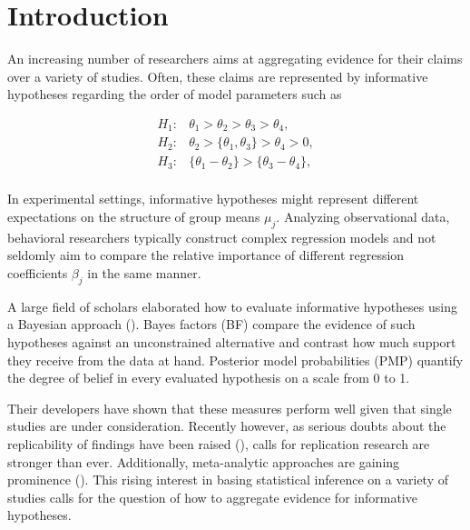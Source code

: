 \documentclass[11pt, a4paper]{article} %
\begin{document}
\section{Introduction}
An increasing number of researchers aims at aggregating evidence for their claims over a variety of studies. Often, these claims are represented by informative hypotheses regarding the order of model parameters such as

\begin{equation}
\begin{aligned}
H_1: & \theta_1>\theta_2>\theta_3>\theta_4, \\
H_2: & \theta_2>\{\theta_1 , \theta_3\}>\theta_4 > 0, \\
H_3: & \{\theta_1- \theta_2\} > \{ \theta_3- \theta_4\}, \\
\end{aligned}
\end{equation}

\noindent In experimental settings, informative hypotheses might represent different expectations on the structure of group means $\mu_j$. Analyzing observational data, behavioral researchers typically construct complex regression models and not seldomly aim to compare the relative importance of different regression coefficients $\beta_j$ in the same manner.

A large field of scholars elaborated how to evaluate informative hypotheses using a Bayesian approach (\citet{Gu2014,Hoijtink2012,Klugkist2005,Klugkist2005b}). Bayes factors (BF) compare the evidence of such hypotheses against an unconstrained alternative and contrast how much support they receive from the data at hand. Posterior model probabilities (PMP) quantify the degree of belief in every evaluated hypothesis on a scale from 0 to 1.

Their developers have shown that these measures perform well given that single studies are under consideration. Recently however, as serious doubts about the replicability of findings have been raised (\citet{aac4716}), calls for replication research are stronger than ever. Additionally, meta-analytic approaches are gaining prominence (\citet*{doi:10.1177/0956797613504966}). This rising interest in basing statistical inference on a variety of studies calls for the question of how to aggregate evidence for informative hypotheses.
\end{document}

